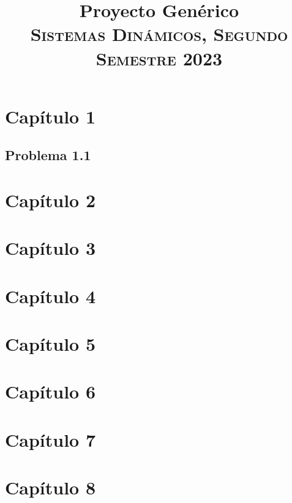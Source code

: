 \documentclass[conference]{IEEEtran}
\begin{document}
\title{Proyecto Genérico \\
{\footnotesize \scshape{Sistemas Dinámicos, Segundo Semestre 2023}}
}

\author{
}



\maketitle


\section{Capítulo 1}

\subsection{Problema 1.1}

\section{Capítulo 2}
\section{Capítulo 3}
\section{Capítulo 4}
\section{Capítulo 5}
\section{Capítulo 6}
\section{Capítulo 7}
\section{Capítulo 8}
\end{document}
